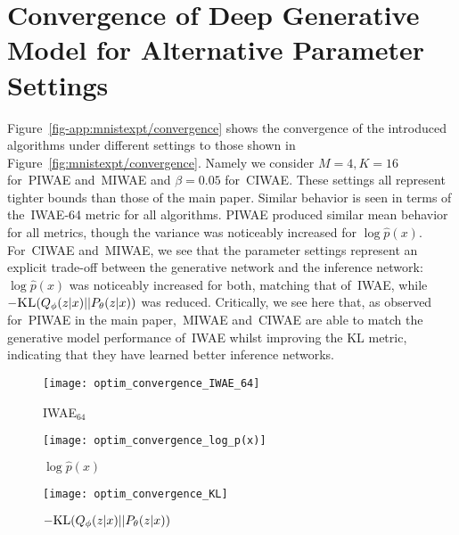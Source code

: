 
\section{Convergence of Deep Generative Model for Alternative Parameter Settings}
\label{sec:app:exp-algs}

Figure~\ref{fig-app:mnistexpt/convergence} shows the convergence of the introduced algorithms under different
settings to those shown in Figure~\ref{fig:mnistexpt/convergence}. Namely we consider $M=4, K=16$ for~\gls{PIWAE} and~\gls{MIWAE} 
and $\beta = 0.05$ for~\gls{CIWAE}.  These settings all represent tighter bounds than those of the main paper.
Similar behavior is seen in terms of the~\gls{IWAE}-64 metric for all algorithms.  \gls{PIWAE} produced
similar mean behavior for all metrics, though the variance was noticeably increased for $\log \hat{p}(x)$.
For~\gls{CIWAE} and~\gls{MIWAE}, we see that the parameter settings represent an explicit trade-off between
the generative network and the inference network:  $\log \hat{p}(x)$ was noticeably increased for both, matching
that of~\gls{IWAE}, while $-\textsc{KL}(Q_{\phi}(z \lvert x) || P_{\theta}(z \lvert x))$ was reduced.
Critically, we see here that, as observed for~\gls{PIWAE} in the main paper,~\gls{MIWAE} and~\gls{CIWAE} are able to
match the generative model performance of~\gls{IWAE} whilst improving the KL metric, indicating that they have learned
better inference networks.

\begin{figure*}[h]
	\centering
   	\begin{subfigure}[b]{0.33\textwidth}
        \centering
        \texttt{[image: optim\_convergence\_IWAE\_64]}
        \caption{\textsc{IWAE}$_{64}$ \label{fig-app:mnistexpt/convergence/iwae64}}
    \end{subfigure}
	\begin{subfigure}[b]{0.33\textwidth}
		\centering
		\texttt{[image: optim\_convergence\_log\_p(x)]}
		\caption{$\log \hat{p}(x)$ \label{fig-app:mnistexpt/convergence/logpx}}
	\end{subfigure}
	\begin{subfigure}[b]{0.33\textwidth}
		\centering
		\texttt{[image: optim\_convergence\_KL]}
		\caption{$-\mathrm{KL}(Q_{\phi}(z \lvert x) || P_{\theta}(z \lvert x))$ \label{fig-app:mnistexpt/convergence/kl}}
	\end{subfigure}
	\caption{Convergence of different evaluation metrics for each method.  Plotting conventions as per
		 Figure~\ref{fig:mnistexpt/convergence}.
		\vspace{-12pt}  \label{fig-app:mnistexpt/convergence}}
\end{figure*}